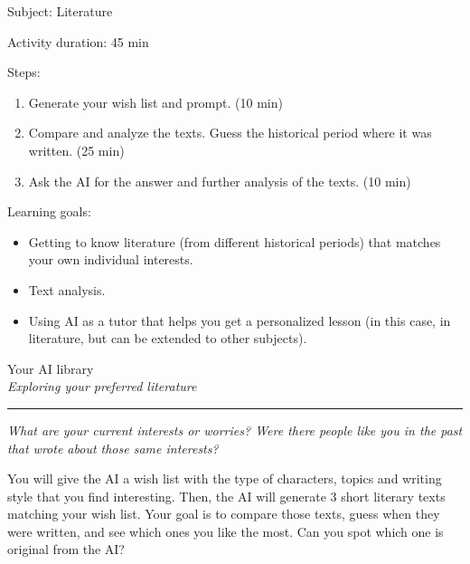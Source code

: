 \documentclass[12pt]{article}
\begin{document}
\vspace*{0.5\textheight}

Subject: Literature

Activity duration: 45 min

\vspace{0.5cm}

Steps:
\begin{enumerate}
    \item Generate your wish list and prompt. (10 min)
    \item Compare and analyze the texts. Guess the historical period where it was written. (25 min)
    \item Ask the AI for the answer and further analysis of the texts. (10 min)
\end{enumerate}

Learning goals:

\begin{itemize}
    \item Getting to know literature (from different historical periods) that matches your own individual interests.
    \item Text analysis.
    \item Using AI as a tutor that helps you get a personalized lesson (in this case, in literature, but can be extended to other subjects).
\end{itemize}

\newpage

\begin{center}
    {\Huge \color{maincolor} Your AI library}\\[5pt]
    {\large \textit{Exploring your preferred literature}}\\
    \rule{\linewidth}{1pt}
\end{center}

\vspace{0.5cm}

\textit{What are your current interests or worries? Were there people like you in the past that wrote about those same interests?}
\vspace{0.3cm}

You will give the AI a wish list with the type of characters, topics and writing style that you find interesting. Then, the AI will generate 3 short literary texts matching your wish list. Your goal is to compare those texts, guess when they were written, and see which ones you like the most. Can you spot which one is original from the AI?
\end{document}
